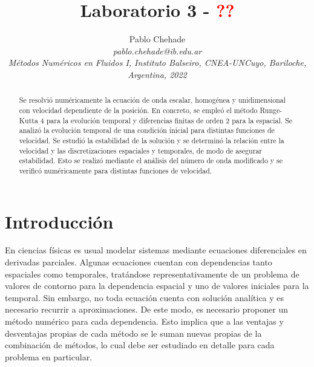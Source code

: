 \documentclass[aps,prb,twocolumn,superscriptaddress,floatfix,longbibliography,10pt]{revtex4-2}
\newcounter{para}
\begin{document}
\newcommand{\mytitle}{Laboratorio 3 - \textcolor{red}{??}}

\title{\mytitle}

\author{Pablo Chehade \\
    \small \textit{pablo.chehade@ib.edu.ar} \\
    \small \textit{Métodos Numéricos en Fluidos I, Instituto Balseiro, CNEA-UNCuyo, Bariloche, Argentina, 2022} \\}


\begin{abstract}

Se resolvió numéricamente la ecuación de onda escalar, homogénea y unidimensional con velocidad dependiente de la posición. En concreto, se empleó el método Runge-Kutta 4 para la evolución temporal y diferencias finitas de orden 2 para la espacial. Se analizó la evolución temporal de una condición inicial para distintas funciones de velocidad. Se estudió la estabilidad de la solución y se determinó la relación entre la velocidad y las discretizaciones espaciales y temporales, de modo de asegurar estabilidad. Esto se realizó mediante el análisis del número de onda modificado y se verificó numéricamente para distintas funciones de velocidad.

\end{abstract}

\maketitle

\section{Introducción}

En ciencias físicas es usual modelar sistemas mediante ecuaciones diferenciales en derivadas parciales. Algunas ecuaciones cuentan con dependencias tanto espaciales como temporales, tratándose representativamente de un problema de valores de contorno para la dependencia espacial y uno de valores iniciales para la temporal. Sin embargo, no toda ecuación cuenta con solución analítica y es necesario recurrir a aproximaciones. De este modo, es necesario proponer un método numérico para cada dependencia. Esto implica que a las ventajas y desventajas propias de cada método se le suman nuevas propias de la combinación de métodos, lo cual debe ser estudiado en detalle para cada problema en particular.
\end{document}

